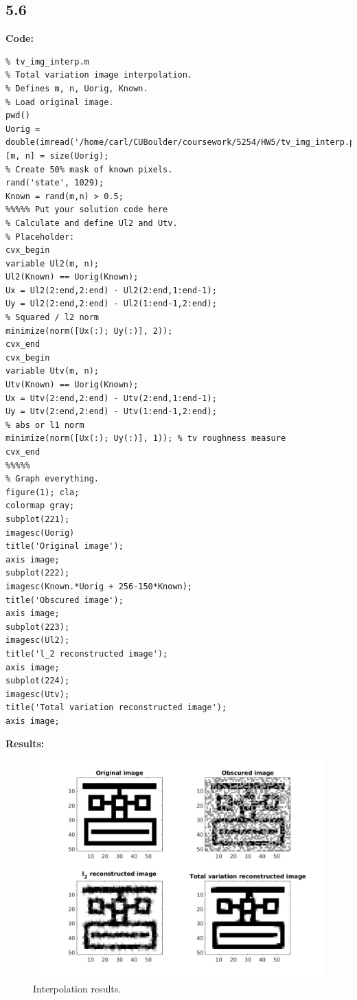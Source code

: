 \documentclass[12pt]{article}
\begin{document}
\subsection*{5.6}
\textbf{Code:}
\begin{lstlisting}
% tv_img_interp.m
% Total variation image interpolation.
% Defines m, n, Uorig, Known.
% Load original image.
pwd()
Uorig = double(imread('/home/carl/CUBoulder/coursework/5254/HW5/tv_img_interp.png'));
[m, n] = size(Uorig);
% Create 50% mask of known pixels.
rand('state', 1029);
Known = rand(m,n) > 0.5;
%%%%% Put your solution code here
% Calculate and define Ul2 and Utv.
% Placeholder:
cvx_begin
variable Ul2(m, n);
Ul2(Known) == Uorig(Known);
Ux = Ul2(2:end,2:end) - Ul2(2:end,1:end-1);
Uy = Ul2(2:end,2:end) - Ul2(1:end-1,2:end);
% Squared / l2 norm
minimize(norm([Ux(:); Uy(:)], 2)); 
cvx_end
cvx_begin
variable Utv(m, n);
Utv(Known) == Uorig(Known);
Ux = Utv(2:end,2:end) - Utv(2:end,1:end-1);
Uy = Utv(2:end,2:end) - Utv(1:end-1,2:end);
% abs or l1 norm
minimize(norm([Ux(:); Uy(:)], 1)); % tv roughness measure
cvx_end
%%%%%
% Graph everything.
figure(1); cla;
colormap gray;
subplot(221);
imagesc(Uorig)
title('Original image');
axis image;
subplot(222);
imagesc(Known.*Uorig + 256-150*Known);
title('Obscured image');
axis image;
subplot(223);
imagesc(Ul2);
title('l_2 reconstructed image');
axis image;
subplot(224);
imagesc(Utv);
title('Total variation reconstructed image');
axis image;
\end{lstlisting}
\textbf{Results:}\\
\begin{figure}[h]
\centering
\includegraphics[scale=.30]{interpolation.jpg}
\caption{Interpolation results.}
\end{figure}
\end{document}
